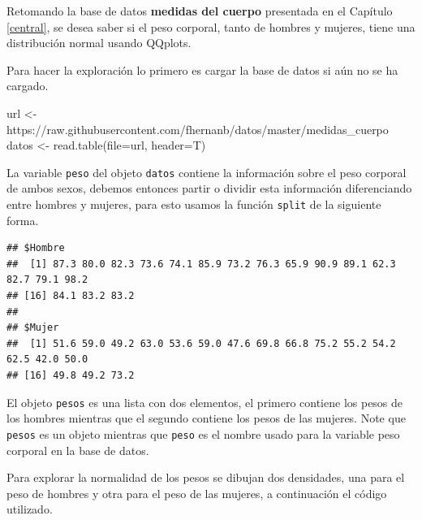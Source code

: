 \documentclass[
]{book}
\makeatletter
\newenvironment{Shaded}{\begin{snugshade}}{\end{snugshade}}
\newcommand{\AttributeTok}[1]{\textcolor[rgb]{0.77,0.63,0.00}{#1}}
\newcommand{\FunctionTok}[1]{\textcolor[rgb]{0.00,0.00,0.00}{#1}}
\newcommand{\NormalTok}[1]{#1}
\newcommand{\OtherTok}[1]{\textcolor[rgb]{0.56,0.35,0.01}{#1}}
\newcommand{\SpecialCharTok}[1]{\textcolor[rgb]{0.00,0.00,0.00}{#1}}
\newcommand{\StringTok}[1]{\textcolor[rgb]{0.31,0.60,0.02}{#1}}
\newenvironment{kframe}{%
\medskip{}
\setlength{\fboxsep}{.8em}
 \def\at@end@of@kframe{}%
 \ifinner\ifhmode%
  \def\at@end@of@kframe{\end{minipage}}%
  \begin{minipage}{\columnwidth}%
 \fi\fi%
 \def\FrameCommand##1{\hskip\@totalleftmargin \hskip-\fboxsep
 \colorbox{shadecolor}{##1}\hskip-\fboxsep
     \hskip-\linewidth \hskip-\@totalleftmargin \hskip\columnwidth}%
 \MakeFramed {\advance\hsize-\width
   \@totalleftmargin\z@ \linewidth\hsize
   \@setminipage}}%
 {\par\unskip\endMakeFramed%
 \at@end@of@kframe}
\renewenvironment{Shaded}{\begin{kframe}}{\end{kframe}}
\makeatother
\begin{document}
Retomando la base de datos \textbf{medidas del cuerpo} presentada en el Capítulo \ref{central}, se desea saber si el peso corporal, tanto de hombres y mujeres, tiene una distribución normal usando QQplots.

Para hacer la exploración lo primero es cargar la base de datos si aún no se ha cargado.

\begin{Shaded}
\begin{Highlighting}[]
\NormalTok{url }\OtherTok{\textless{}{-}} \StringTok{\textquotesingle{}https://raw.githubusercontent.com/fhernanb/datos/master/medidas\_cuerpo\textquotesingle{}}
\NormalTok{datos }\OtherTok{\textless{}{-}} \FunctionTok{read.table}\NormalTok{(}\AttributeTok{file=}\NormalTok{url, }\AttributeTok{header=}\NormalTok{T)}
\end{Highlighting}
\end{Shaded}

La variable \texttt{peso} del objeto \texttt{datos} contiene la información sobre el peso corporal de ambos sexos, debemos entonces partir o dividir esta información diferenciando entre hombres y mujeres, para esto usamos la función \texttt{split} de la siguiente forma.

\begin{Shaded}
\end{Shaded}

\begin{verbatim}
## $Hombre
##  [1] 87.3 80.0 82.3 73.6 74.1 85.9 73.2 76.3 65.9 90.9 89.1 62.3 82.7 79.1 98.2
## [16] 84.1 83.2 83.2
## 
## $Mujer
##  [1] 51.6 59.0 49.2 63.0 53.6 59.0 47.6 69.8 66.8 75.2 55.2 54.2 62.5 42.0 50.0
## [16] 49.8 49.2 73.2
\end{verbatim}

El objeto \texttt{pesos} es una lista con dos elementos, el primero contiene los pesos de los hombres mientras que el segundo contiene los pesos de las mujeres. Note que \texttt{pesos} es un objeto mientras que \texttt{peso} es el nombre usado para la variable peso corporal en la base de datos.

Para explorar la normalidad de los pesos se dibujan dos densidades, una para el peso de hombres y otra para el peso de las mujeres, a continuación el código utilizado.
\end{document}
